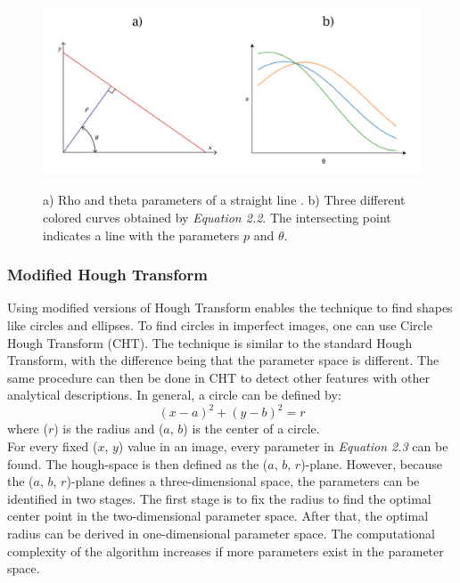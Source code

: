 \begin{figure}[htbp]
    \centering
     \includegraphics[width=1\linewidth]{figures/PDF/Hough_graph.pdf}\\
    \caption{a) Rho and theta parameters of a straight line \cite{Duda}. b) Three different colored curves obtained by \textit{Equation 2.2}. The intersecting point indicates a line with the parameters $p$ and $\theta$.}
    \label{fig:hough graph}
\end{figure}

\subsubsection{Modified Hough Transform}
Using modified versions of Hough Transform enables the technique to find shapes like circles and ellipses. To find circles in imperfect images, one can use Circle Hough Transform (CHT). The technique is similar to the standard Hough Transform, with the difference being that the parameter space is different. The same procedure can then be done in CHT to detect other features with other analytical descriptions. In general, a circle can be defined by: \begin{equation} {(x-a)}^2 + {(y-b)}^2 = r \end{equation} where ($r$) is the radius and ($a$, $b$) is the center of a circle. \\ 

\noindent For every fixed ($x$, $y$) value in an image, every parameter in \textit{Equation 2.3} can be found. The hough-space is then defined as the ($a$, $b$, $r$)-plane. However, because the ($a$, $b$, $r$)-plane defines a three-dimensional space, the parameters can be identified in two stages. The first stage is to fix the radius to find the optimal center point in the two-dimensional parameter space. After that, the optimal radius can be derived in one-dimensional parameter space. The computational complexity of the algorithm increases if more parameters exist in the parameter space. \\


